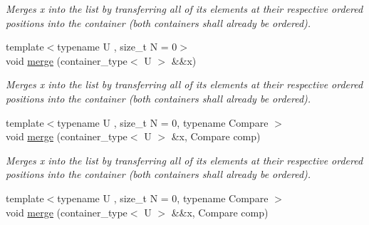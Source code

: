 \begin{DoxyCompactItemize}
\begin{DoxyCompactList}\small\item\em Merges x into the list by transferring all of its elements at their respective ordered positions into the container (both containers shall already be ordered). \end{DoxyCompactList}\item 
\hypertarget{classheterogeneous_1_1heterolist_3_01_t_00_01_types_8_8_8_4_adaf52585888e61869f115f8c5ef0b6fa}{}{\footnotesize template$<$typename U , size\+\_\+t N = 0$>$ }\\void \hyperlink{classheterogeneous_1_1heterolist_3_01_t_00_01_types_8_8_8_4_adaf52585888e61869f115f8c5ef0b6fa}{merge} (container\+\_\+type$<$ U $>$ \&\&x)\label{classheterogeneous_1_1heterolist_3_01_t_00_01_types_8_8_8_4_adaf52585888e61869f115f8c5ef0b6fa}

\begin{DoxyCompactList}\small\item\em Merges x into the list by transferring all of its elements at their respective ordered positions into the container (both containers shall already be ordered). \end{DoxyCompactList}\item 
\hypertarget{classheterogeneous_1_1heterolist_3_01_t_00_01_types_8_8_8_4_ac4a7dd3897f20befc9a19860aa947bbd}{}{\footnotesize template$<$typename U , size\+\_\+t N = 0, typename Compare $>$ }\\void \hyperlink{classheterogeneous_1_1heterolist_3_01_t_00_01_types_8_8_8_4_ac4a7dd3897f20befc9a19860aa947bbd}{merge} (container\+\_\+type$<$ U $>$ \&x, Compare comp)\label{classheterogeneous_1_1heterolist_3_01_t_00_01_types_8_8_8_4_ac4a7dd3897f20befc9a19860aa947bbd}

\begin{DoxyCompactList}\small\item\em Merges x into the list by transferring all of its elements at their respective ordered positions into the container (both containers shall already be ordered). \end{DoxyCompactList}\item 
\hypertarget{classheterogeneous_1_1heterolist_3_01_t_00_01_types_8_8_8_4_ad6e7b1aa7a83ef894800eeb0fc7eea05}{}{\footnotesize template$<$typename U , size\+\_\+t N = 0, typename Compare $>$ }\\void \hyperlink{classheterogeneous_1_1heterolist_3_01_t_00_01_types_8_8_8_4_ad6e7b1aa7a83ef894800eeb0fc7eea05}{merge} (container\+\_\+type$<$ U $>$ \&\&x, Compare comp)\label{classheterogeneous_1_1heterolist_3_01_t_00_01_types_8_8_8_4_ad6e7b1aa7a83ef894800eeb0fc7eea05}


\end{DoxyCompactItemize}
